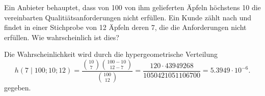 Ein Anbieter behauptet, dass von 100 von ihm gelieferten Äpfeln
höchstens 10 die vereinbarten Qualitiätsanforderungen nicht erfüllen.
Ein Kunde zählt nach und findet in einer Stichprobe von 12 Äpfeln
deren 7, die die Anforderungen nicht erfüllen.
Wie wahrscheinlich ist dies?

\begin{loesung}
Die Wahrscheinlichkeit wird durch die hypergeometrische Verteilung
\[
h(7\mid 100; 10; 12)
=
\frac{
\binom{10}{7}
\binom{100-10}{12-7}
}{
\binom{100}{12}
}
=
\frac{120\cdot 43949268}{1050421051106700}
=
5.3949\cdot 10^{-6}.
\]
gegeben.
\end{loesung}

